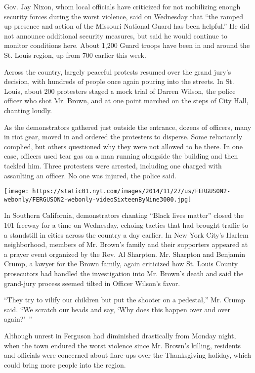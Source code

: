 Gov. Jay Nixon, whom local officials have criticized for not mobilizing
enough security forces during the worst violence, said on Wednesday that
``the ramped up presence and action of the Missouri National Guard has
been helpful.'' He did not announce additional security measures, but
said he would continue to monitor conditions here. About 1,200 Guard
troops have been in and around the St. Louis region, up from 700 earlier
this week.

Across the country, largely peaceful protests resumed over the grand
jury's decision, with hundreds of people once again pouring into the
streets. In St. Louis, about 200 protesters staged a mock trial of
Darren Wilson, the police officer who shot Mr. Brown, and at one point
marched on the steps of City Hall, chanting loudly.

As the demonstrators gathered just outside the entrance, dozens of
officers, many in riot gear, moved in and ordered the protesters to
disperse. Some reluctantly complied, but others questioned why they were
not allowed to be there. In one case, officers used tear gas on a man
running alongside the building and then tackled him. Three protesters
were arrested, including one charged with assaulting an officer. No one
was injured, the police said.

\texttt{[image: https://static01.nyt.com/images/2014/11/27/us/FERGUSON2-webonly/FERGUSON2-webonly-videoSixteenByNine3000.jpg]}

In Southern California, demonstrators chanting ``Black lives matter''
closed the 101 freeway for a time on Wednesday, echoing tactics that had
brought traffic to a standstill in cities across the country a day
earlier. In New York City's Harlem neighborhood, members of Mr. Brown's
family and their supporters appeared at a prayer event organized by the
Rev. Al Sharpton. Mr. Sharpton and Benjamin Crump, a lawyer for the
Brown family, again criticized how St. Louis County prosecutors had
handled the investigation into Mr. Brown's death and said the grand-jury
process seemed tilted in Officer Wilson's favor.

``They try to vilify our children but put the shooter on a pedestal,''
Mr. Crump said. ``We scratch our heads and say, `Why does this happen
over and over again?'~''

Although unrest in Ferguson had diminished drastically from Monday
night, when the town endured the worst violence since Mr. Brown's
killing, residents and officials were concerned about flare-ups over the
Thanksgiving holiday, which could bring more people into the region.

